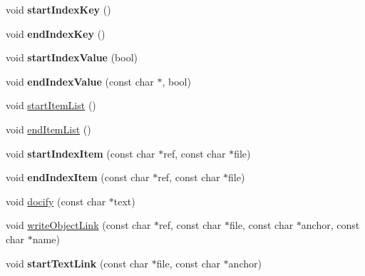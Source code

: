 \begin{DoxyCompactItemize}
\item 
\hypertarget{class_html_generator_a35efacde67c233f22b5a11becdaaaa13}{void {\bfseries start\-Index\-Key} ()}\label{class_html_generator_a35efacde67c233f22b5a11becdaaaa13}

\item 
\hypertarget{class_html_generator_a22c9a476a4b39fc3cffecf763b39b05c}{void {\bfseries end\-Index\-Key} ()}\label{class_html_generator_a22c9a476a4b39fc3cffecf763b39b05c}

\item 
\hypertarget{class_html_generator_a86fbd00ac27865e07b0bbc613647fc85}{void {\bfseries start\-Index\-Value} (bool)}\label{class_html_generator_a86fbd00ac27865e07b0bbc613647fc85}

\item 
\hypertarget{class_html_generator_a130d05863092eaa6de041b744e4750f8}{void {\bfseries end\-Index\-Value} (const char $\ast$, bool)}\label{class_html_generator_a130d05863092eaa6de041b744e4750f8}

\item 
void \hyperlink{class_html_generator_af2a17ac8deb6919dda56ae5107ea1529}{start\-Item\-List} ()
\item 
void \hyperlink{class_html_generator_ab11dc69249cdab99802fe788b9da43d5}{end\-Item\-List} ()
\item 
\hypertarget{class_html_generator_ad7ab1d36b425503e9dd9656ca85ec6db}{void {\bfseries start\-Index\-Item} (const char $\ast$ref, const char $\ast$file)}\label{class_html_generator_ad7ab1d36b425503e9dd9656ca85ec6db}

\item 
\hypertarget{class_html_generator_a05f165444ace049ae9353f93a55da1c6}{void {\bfseries end\-Index\-Item} (const char $\ast$ref, const char $\ast$file)}\label{class_html_generator_a05f165444ace049ae9353f93a55da1c6}

\item 
void \hyperlink{class_html_generator_ab9d90b3c6f2e1105a2fe6ce2a1486f75}{docify} (const char $\ast$text)
\item 
void \hyperlink{class_html_generator_a78d7e4718290246f77043de949c83081}{write\-Object\-Link} (const char $\ast$ref, const char $\ast$file, const char $\ast$anchor, const char $\ast$name)
\item 
\hypertarget{class_html_generator_a7eb8349051c2985097c470a8ad97fdca}{void {\bfseries start\-Text\-Link} (const char $\ast$file, const char $\ast$anchor)}\label{class_html_generator_a7eb8349051c2985097c470a8ad97fdca}


\end{DoxyCompactItemize}
